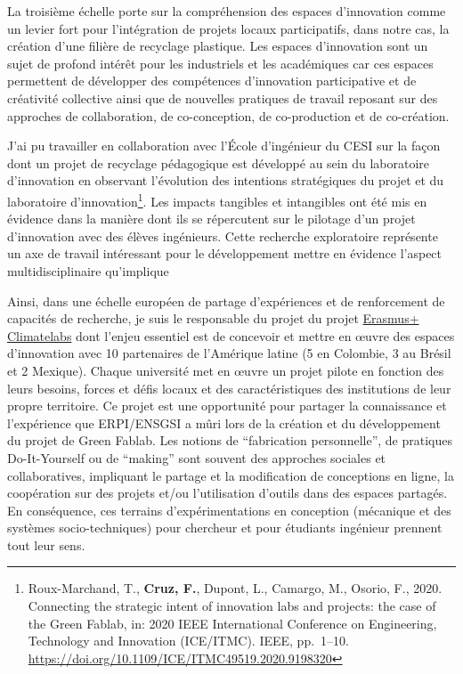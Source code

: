 \documentclass[
  11pt,
]{article}
\begin{document}
La troisième échelle porte sur la compréhension des espaces d'innovation
comme un levier fort pour l'intégration de projets locaux participatifs,
dans notre cas, la création d'une filière de recyclage plastique. Les
espaces d'innovation sont un sujet de profond intérêt pour les
industriels et les académiques car ces espaces permettent de développer
des compétences d'innovation participative et de créativité collective
ainsi que de nouvelles pratiques de travail reposant sur des approches
de collaboration, de co-conception, de co-production et de co-création.

J'ai pu travailler en collaboration avec l'École d'ingénieur du CESI sur
la façon dont un projet de recyclage pédagogique est développé au sein
du laboratoire d'innovation en observant l'évolution des intentions
stratégiques du projet et du laboratoire d'innovation\footnote{Roux-Marchand,
  T., \textbf{Cruz, F.}, Dupont, L., Camargo, M., Osorio, F., 2020.
  Connecting the strategic intent of innovation labs and projects: the
  case of the Green Fablab, in: 2020 IEEE International Conference on
  Engineering, Technology and Innovation (ICE/ITMC). IEEE, pp.~1--10.
  \url{https://doi.org/10.1109/ICE/ITMC49519.2020.9198320}}. Les impacts
tangibles et intangibles ont été mis en évidence dans la manière dont
ils se répercutent sur le pilotage d'un projet d'innovation avec des
élèves ingénieurs. Cette recherche exploratoire représente un axe de
travail intéressant pour le développement mettre en évidence l'aspect
multidisciplinaire qu'implique

Ainsi, dans une échelle européen de partage d'expériences et de
renforcement de capacités de recherche, je suis le responsable du projet
du projet
\href{https://erpi.univ-lorraine.fr/fr/projects/Climatelabs/}{Erasmus+
Climatelabs} dont l'enjeu essentiel est de concevoir et mettre en œuvre
des espaces d'innovation avec 10 partenaires de l'Amérique latine (5 en
Colombie, 3 au Brésil et 2 Mexique). Chaque université met en œuvre un
projet pilote en fonction des leurs besoins, forces et défis locaux et
des caractéristiques des institutions de leur propre territoire. Ce
projet est une opportunité pour partager la connaissance et l'expérience
que ERPI/ENSGSI a mûri lors de la création et du développement du projet
de Green Fablab. Les notions de ``fabrication personnelle'', de
pratiques Do-It-Yourself ou de ``making'' sont souvent des approches
sociales et collaboratives, impliquant le partage et la modification de
conceptions en ligne, la coopération sur des projets et/ou l'utilisation
d'outils dans des espaces partagés. En conséquence, ces terrains
d'expérimentations en conception (mécanique et des systèmes
socio-techniques) pour chercheur et pour étudiants ingénieur prennent
tout leur sens.
\end{document}
